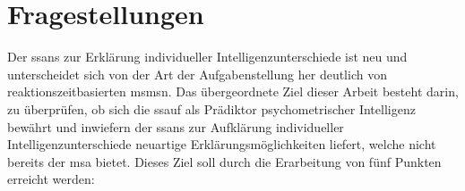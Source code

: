 \documentclass[11pt, twoside, a4paper]{book}		%
\begin{document}
\section{Fragestellungen \label{sec:Fragestellungen}}

Der \gls{ssans} zur Erklärung individueller Intelligenzunterschiede ist neu und unterscheidet sich von der Art der Aufgabenstellung her deutlich von reaktionszeitbasierten \glspl{msm}n. Das übergeordnete Ziel dieser Arbeit besteht darin, zu überprüfen, ob sich die \gls{ssauf} als Prädiktor psychometrischer Intelligenz bewährt und inwiefern der \gls{ssans} zur Aufklärung individueller Intelligenzunterschiede neuartige Erklärungsmöglichkeiten liefert, welche nicht bereits der \gls{msa} bietet. Dieses Ziel soll durch die Erarbeitung von fünf Punkten erreicht werden:
\end{document}
